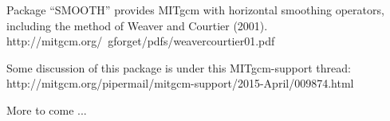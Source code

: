 
Package ``SMOOTH'' provides MITgcm with horizontal smoothing
operators, including the method of Weaver and Courtier (2001).
http://mitgcm.org/~gforget/pdfs/weavercourtier01.pdf

Some discussion of this package is under this MITgcm-support thread:
http://mitgcm.org/pipermail/mitgcm-support/2015-April/009874.html

More to come ...

